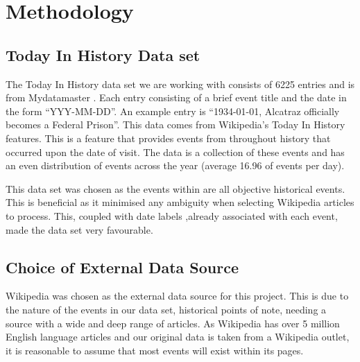 \documentclass[bsc,frontabs,twoside,singlespacing,parskip,deptreport]{infthesis}     %
\begin{document}
\chapter{Methodology}


\section{Today In History Data set}
The Today In History data set we are working with consists of 6225 entries and is from Mydatamaster \cite{mydatamaster}.
Each entry consisting of a  brief event title and the date in the form ``YYY-MM-DD''.
An example entry is ``1934-01-01, Alcatraz officially becomes a Federal Prison''.
This data comes from Wikipedia's Today In History features. This is a feature that provides events from
throughout history that occurred upon the date of visit. The data is a collection of these events and has
an even distribution of events across the year (average 16.96 of events per day).


This data set was chosen as the events within are all objective historical events. This is beneficial as it minimised
any ambiguity when selecting Wikipedia articles to process. This, coupled with date labels ,already associated with
each event, made the data set very favourable.


\section{Choice of External Data Source}
Wikipedia was chosen as the external data source for this project.
This is due to the nature of the events in our data set, historical points of note,
needing a source with a wide and deep range of articles.
As Wikipedia has over 5 million English language articles \cite{wikipedaisize} and our original data
is taken from a Wikipedia outlet, it is reasonable to assume
that most events will exist within its pages.
\end{document}
